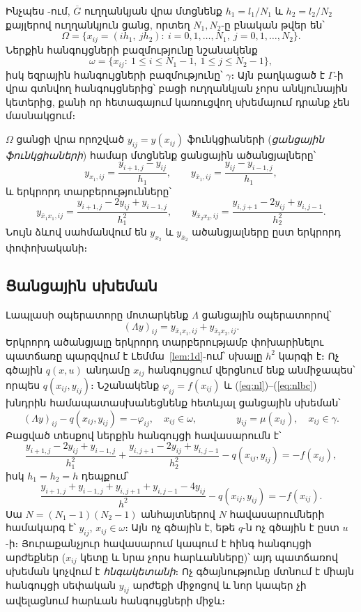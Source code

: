 \documentclass[12pt,a4paper]{article}
\theoremstyle{arm}
\theoremstyle{armdef}
\numberwithin{equation}{section}
\newcommand{\G}{\overline{G}}
\begin{document}
Ինչպես \cite[մաս~III, գլ.~2, §~1, էջ~291--292]{sam}-ում, $\G$ ուղղանկյան վրա մտցնենք $h_1=l_1/N_1$ և $h_2=l_2/N_2$ քայլերով ուղղանկյուն ցանց, որտեղ $N_1,N_2$-ը բնական թվեր են՝
\[\Omega=\{x_{ij}=(ih_1,\ jh_2):\ i=0,1,\dots,N_1,\ j=0,1,\dots,N_2\}.\]
Ներքին հանգույցների բազմությունը նշանակենք
\[\omega=\{x_{ij}:\ 1\le i\le N_1-1,\ 1\le j\le N_2-1\},\]
իսկ եզրային հանգույցների բազմությունը՝ $\gamma$։ Այն բաղկացած է $\Gamma$-ի վրա գտնվող հանգույցներից՝ բացի ուղղանկյան չորս անկյունային կետերից, քանի որ հետագայում կառուցվող սխեմայում դրանք չեն մասնակցում։

$\Omega$ ցանցի վրա որոշված $y_{ij}=y(x_{ij})$ ֆունկցիաների (\emph{ցանցային ֆունկցիաների}) համար մտցնենք ցանցային ածանցյալները՝
\[y_{x_1,ij}=\frac{y_{i+1,j}-y_{ij}}{h_1},\qquad y_{\bar x_1,ij}=\frac{y_{ij}-y_{i-1,j}}{h_1},\]
և երկրորդ տարբերությունները՝
\begin{equation}\label{eq:seconddiff}
y_{\bar x_1x_1,ij}=\frac{y_{i+1,j}-2y_{ij}+y_{i-1,j}}{h_1^2},\qquad
y_{\bar x_2x_2,ij}=\frac{y_{i,j+1}-2y_{ij}+y_{i,j-1}}{h_2^2}.
\end{equation}
Նույն ձևով սահմանվում են $y_{x_2}$ և $y_{\bar x_2}$ ածանցյալները ըստ երկրորդ փոփոխականի։

\subsection{Ցանցային սխեման}

Լապլասի օպերատորը մոտարկենք $\Lambda$ ցանցային օպերատորով՝
\begin{equation}\label{eq:Lambdah}
(\Lambda y)_{ij}=y_{\bar x_1x_1,ij}+y_{\bar x_2x_2,ij}.
\end{equation}
Երկրորդ ածանցյալը երկրորդ տարբերությամբ փոխարինելու պատճառը պարզվում է Լեմմա~\ref{lem:1d}-ում՝ սխալը $h^2$ կարգի է։ Ոչ գծային $q(x,u)$ անդամը $x_{ij}$ հանգույցում վերցնում ենք անմիջապես՝ որպես $q(x_{ij},y_{ij})$։ Նշանակենք $\varphi_{ij}=f(x_{ij})$ և (\ref{eq:nl})--(\ref{eq:nlbc}) խնդրին համապատասխանեցնենք հետևյալ ցանցային սխեման՝
\begin{equation}\label{eq:gridscheme}
(\Lambda y)_{ij}-q(x_{ij},y_{ij})=-\varphi_{ij},\quad x_{ij}\in\omega,\qquad\qquad y_{ij}=\mu(x_{ij}),\quad x_{ij}\in\gamma.
\end{equation}
Բացված տեսքով ներքին հանգույցի հավասարումն է՝
\[\frac{y_{i+1,j}-2y_{ij}+y_{i-1,j}}{h_1^2}+\frac{y_{i,j+1}-2y_{ij}+y_{i,j-1}}{h_2^2}-q(x_{ij},y_{ij})=-f(x_{ij}),\]
իսկ $h_1=h_2=h$ դեպքում՝
\[\frac{y_{i+1,j}+y_{i-1,j}+y_{i,j+1}+y_{i,j-1}-4y_{ij}}{h^2}-q(x_{ij},y_{ij})=-f(x_{ij}).\]
Սա $N=(N_1-1)(N_2-1)$ անհայտներով $N$ հավասարումների համակարգ է՝ $y_{ij}$, $x_{ij}\in\omega$։ Այն ոչ գծային է, եթե $q$-ն ոչ գծային է ըստ $u$-ի։ Յուրաքանչյուր հավասարում կապում է հինգ հանգույցի արժեքներ ($x_{ij}$ կետը և նրա չորս հարևանները)՝ այդ պատճառով սխեման կոչվում է \emph{հնգակետանի}։ Ոչ գծայնությունը մտնում է միայն հանգույցի սեփական $y_{ij}$ արժեքի միջոցով և նոր կապեր չի ավելացնում հարևան հանգույցների միջև։
\end{document}
